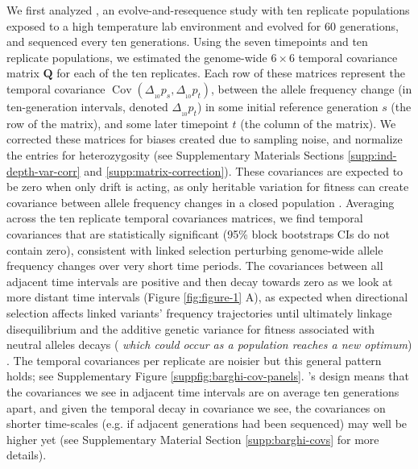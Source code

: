 \documentclass[11pt]{article}
\newcommand{\vb}[1]{{\it \color{blue} #1}}
\DeclareMathOperator{\cov}{Cov}
\begin{document}
We first analyzed \textcite{Barghi2019-qy}, an evolve-and-resequence study with
ten replicate populations exposed to a high temperature lab environment and
evolved for 60 generations, and sequenced every ten generations. Using the
seven timepoints and ten replicate populations, we estimated the genome-wide $6
\times 6$ temporal covariance matrix $\mathbf{Q}$ for each of the ten
replicates. Each row of these matrices represent the temporal covariance
$\cov(\Delta_{_{10}} p_s, \Delta_{_{10}} p_t)$, between the allele frequency
change (in ten-generation intervals, denoted $\Delta_{_{10}} p_t$) in some
initial reference generation $s$ (the row of the matrix), and some later
timepoint $t$ (the column of the matrix). We corrected these matrices for
biases created due to sampling noise, and normalize the entries for
heterozygosity (see Supplementary Materials Sections
\ref{supp:ind-depth-var-corr} and \ref{supp:matrix-correction}). These
covariances are expected to be zero when only drift is acting, as only
heritable variation for fitness can create covariance between allele frequency
changes in a closed population \parencite{Buffalo2019-io}.  Averaging across
the ten replicate temporal covariances matrices, we find temporal covariances
that are statistically significant (95\% block bootstraps CIs do not contain
zero), consistent with linked selection perturbing genome-wide allele frequency
changes over very short time periods. The covariances between all adjacent time
intervals are positive and then decay towards zero as we look at more distant
time intervals (Figure \ref{fig:figure-1} A), as expected when directional
selection affects linked variants' frequency trajectories until ultimately
linkage disequilibrium and the additive genetic variance for fitness associated
with neutral alleles decays (\vb{which could occur as a population reaches
a new optimum}) \parencite{Buffalo2019-io}. The temporal covariances per
replicate are noisier but this general pattern holds; see Supplementary Figure
\ref{suppfig:barghi-cov-panels}.  \textcite{Barghi2019-qy}'s design means that
the covariances we see in adjacent time intervals are on average ten
generations apart, and given the temporal decay in covariance we see, the
covariances on shorter time-scales (e.g. if adjacent generations had been
sequenced) may well be higher yet (see Supplementary Material Section
\ref{supp:barghi-covs} for more details).
\end{document}

